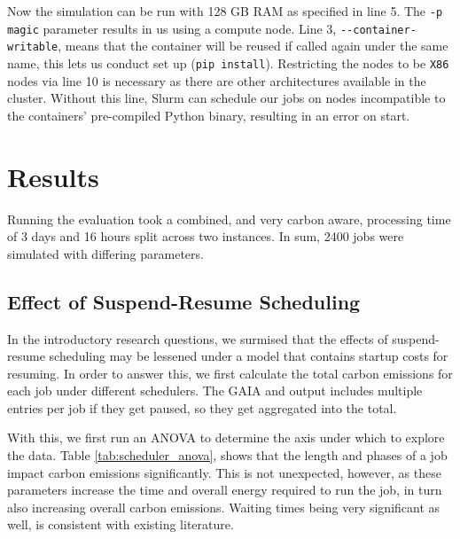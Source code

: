 Now the simulation can be run with 128 GB RAM as specified in line 5. 
The \verb|-p magic| parameter results in us using a compute node. 
Line 3, \verb|--container-writable|, means that the container will be reused if called again under the same name, this lets us conduct set up  (\verb|pip install|).
Restricting the nodes to be \verb|X86| nodes via line 10 is necessary as there are other architectures available in the cluster. 
Without this line, Slurm can schedule our jobs on nodes incompatible to the containers' pre-compiled Python binary, resulting in an error on start.

\section{Results}

Running the evaluation took a combined, and very carbon aware, processing time of 3 days and 16 hours split across two instances.
In sum, 2400 jobs were simulated with differing parameters. 

\subsection{Effect of Suspend-Resume Scheduling}

In the introductory research questions, we surmised that the effects of suspend-resume scheduling may be lessened under a model that contains startup costs for resuming. 
In order to answer this, we first calculate the total carbon emissions for each job under different schedulers. The GAIA and \programname{} output includes multiple entries per job if they get paused, so they get aggregated into the total.

With this, we first run an ANOVA to determine the axis under which to explore the data. Table \ref{tab:scheduler_anova}, shows that the length and phases of a job impact carbon emissions significantly.
This is not unexpected, however, as these parameters increase the time and overall energy required to run the job, in turn also increasing overall carbon emissions.
Waiting times being very significant as well, is consistent with existing literature\cite{wiesner_lets_2021}.


